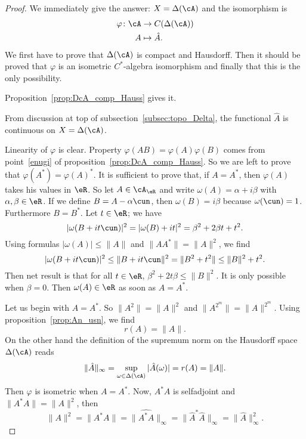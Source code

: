 \begin{proof}
We immediately give the answer: $X=\Delta(\cA)$ and the isomorphism is
        \begin{equation}
        \begin{aligned}
            \varphi \colon \cA &\to C(\Delta(\cA))\\
            A&\mapsto \hat A.
        \end{aligned}
    \end{equation}
We first have to prove that $\Delta(\cA)$ is compact and Hausdorff. Then it should be proved that $\varphi$ is an isometric $C^*$-algebra isomorphism and finally that this is the only possibility.


Proposition~\ref{prop:DcA_comp_Hauss} gives it.


From discussion at top of subsection~\ref{subsec:topo_Delta}, the functional $\hat A$ is continuous on $X=\Delta(\cA)$.


Linearity of $\varphi$ is clear. Property $\varphi(AB)=\varphi(A)\varphi(B)$ comes from point~\ref{enugi} of proposition~\ref{prop:DcA_comp_Hauss}. So we are left to prove that $\varphi(A^*)=\varphi(A)^*$. It is sufficient to prove that, if $A=A^*$, then $\varphi(A)$ takes his values in $\eR$. So let $A\in\cA_{\eR}$ and write $\omega(A)=\alpha+i\beta$ with $\alpha,\beta\in\eR$. If we define $B=A-\alpha\cun$, then $\omega(B)=i\beta$ because $\omega(\cun)=1$. Furthermore $B=B^*$. Let $t\in\eR$; we have
\begin{equation}  \label{eq:rcinq}
|\omega(B+it\cun)|^2=|\omega(B)+it|^2
                    =\beta^2+2\beta t+t^2.
\end{equation}
Using formulas $|\omega(A)|\leq\|A\|$ and $\|AA^*\|=\|A\|^2$, we find
\begin{equation}
  |\omega(B+it\cun)|^2\leq\|B+it\cun\|^2
                      =\|B^2+t^2\|
                      \leq \|B\|^2+t^2.
\end{equation}
Then net result is that for all $t\in\eR$,   $\beta^2+2t\beta\leq \|B\|^2$. It is only possible when $\beta=0$. Then $\omega(A)\in\eR$ as soon as $A=A^*$.


Let us begin with $A=A^*$. So $\|A^2\|=\|A\|^2$ and $\|A^{2^m}\|=\|A\|^{2^m}$. Using proposition~\ref{prop:An_usn}, we find
\[
  r(A)=\|A\|.
\]
On the other hand the definition of the supremum norm on the Hausdorff space $\Delta(\cA)$ reads
\begin{equation} \label{eq:AinfA }
  \|\hat A\|_{\infty}=\sup_{\omega\in\Delta(\cA)}|\hat A(\omega)|=r(A)=\|A\|.
\end{equation}
Then $\varphi$ is isometric when $A=A^*$. Now, $A^*A$ is selfadjoint and $\|A^*A\|=\|A\|^2$, then
\[
\|A\|^2=\|A^*A\|=\|\widehat{A^*A}\|_{\infty}=\|{\hat A}^*\hat A\|_{\infty}=\|\hat A\|^2_{\infty}.
\]


\end{proof}
